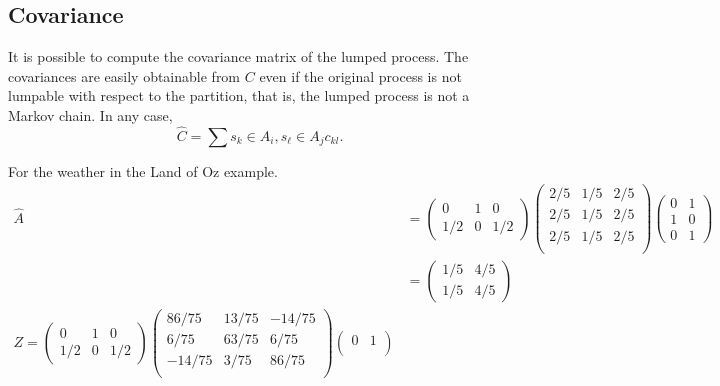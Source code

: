 \documentclass[12pt]{article}
\begin{document}
\subsection*{Covariance}

It is possible to compute the covariance matrix of the lumped process.
The covariances are easily obtainable from \( C \) even if the original
process is not lumpable with respect to the partition, that is, the
lumped process is not a Markov chain.  In any case,
\[
    \hat{C} = \sum{s_k \in A_i, s_{\ell} \in A_j } c_{kl}.
\]

\begin{example}
    For the weather in the Land of Oz example.
    \begin{align*}
        \hat{A} &=
        \begin{pmatrix}
            0 & 1 & 0 \\
            1/2 & 0 & 1/2
        \end{pmatrix}
        \begin{pmatrix}
            2/5 & 1/5 & 2/5 \\
            2/5 & 1/5 & 2/5 \\
            2/5 & 1/5 & 2/5 \\
        \end{pmatrix}
        \begin{pmatrix}
            0 & 1 \\
            1 & 0 \\
            0 & 1
        \end{pmatrix}
        \\
        & =
        \begin{pmatrix}
            1/5 & 4/5 \\
            1/5 & 4/5
        \end{pmatrix}
        \\
        Z =
        \begin{pmatrix}
            0 & 1 & 0 \\
            1/2 & 0 & 1/2
        \end{pmatrix}
        \begin{pmatrix}
            86/75 & 13/75 & -14/75 \\
            6/75 & 63/75 & 6/75 \\
            -14/75 & 3/75 & 86/75 \\
        \end{pmatrix}
        \begin{pmatrix}
            0 & 1 \\

\end{pmatrix}
\end{align*}
\end{example}
\end{document}
